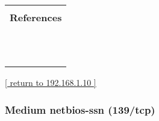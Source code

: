 \documentclass{article}
\begin{document}
\begin{longtable}{|p{}|}
      \hline
      \\
\textbf{References}\\
\rowcolor{white}{\verb=CVE: CVE-2012-0053=}\\
\rowcolor{white}{\verb=BID:51706=}\\
\rowcolor{white}{\verb=Other:=}\\
\rowcolor{white}{\verb=  URL:http://osvdb.org/78556=}\\
\rowcolor{white}{\verb=   URL:http://secunia.com/advisories/47779=}\\
\rowcolor{white}{\verb=   URL:http://www.exploit-db.com/exploits/18442=}\\
\rowcolor{white}{\verb=   URL:http://rhn.redhat.com/errata/RHSA-2012-0128.html=}\\
\rowcolor{white}{\verb=   URL:http://httpd.apache.org/security/vulnerabilities_22.html=}\\
\rowcolor{white}{\verb=   URL:http://svn.apache.org/viewvc?view=\verb-=-\verb=revision&amp;revision=\verb-=-\verb=1235454=}\\
\rowcolor{white}{\verb=   URL:http://lists.opensuse.org/opensuse-security-announce/2012-02/msg00026.htm=}\\
\rowcolor{white}{$\hookrightarrow$\verb=l=}\\
\end{longtable}

\begin{footnotesize}\hyperref[host:192.168.1.10]{[ return to 192.168.1.10 ]}\end{footnotesize}
\subsubsection{Medium netbios-ssn (139/tcp)}
\label{port:192.168.1.10 netbios-ssn (139/tcp) Medium}
\end{document}
